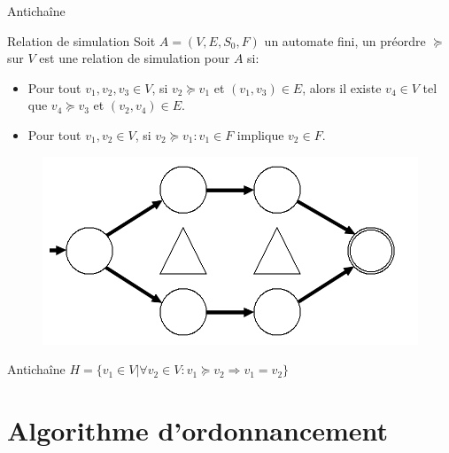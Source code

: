 \documentclass{bredelebeamer}
\begin{document}
\begin{frame}{Antichaîne}

\begin{block}{Relation de simulation}
Soit $A = (V,E,S_0,F)$ un automate fini, un préordre $\succeq$ sur $V$ est une relation de simulation pour $A$ si:
\begin{itemize}

\item Pour tout $v_1, v_2, v_3 \in V$, si $v_2 \succeq v_1$ et $(v_1, v_3) \in E$, alors il existe $v_4 \in V$ tel que $v_4 \succeq v_3$ et $(v_2, v_4) \in E$.
\item Pour tout $v_1, v_2 \in V$, si $v_2 \succeq v_1 : v_1 \in F$ implique $v_2 \in F$.


\end{itemize}
\end{block}
\begin{figure}
\centering
\includegraphics[scale=0.30]{images/exanti2.png}
\end{figure}


\begin{block}{Antichaîne}
\centering
$H = \{v_1 \in V|\forall v_2 \in V : v_1 \succeq v_2 \Rightarrow v_1 = v_2\}$
\end{block}
\end{frame}


\section[Test]{Algorithme d’ordonnancement}
\end{document}
